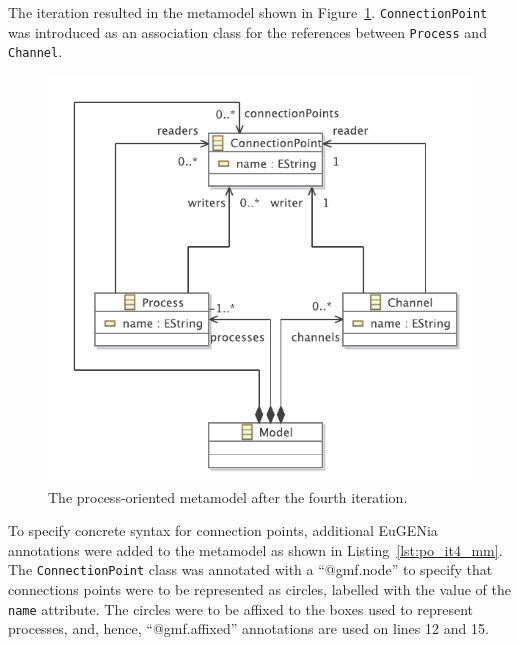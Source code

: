 The iteration resulted in the metamodel shown in Figure~\ref{fig:po_it4_mm}. \texttt{Co\-nn\-ec\-ti\-o\-nP\-oi\-nt} was introduced as an association class for the references between \texttt{Pr\-oc\-e\-ss} and \texttt{Cha\-nn\-el}.

\begin{figure}[htbp]
	\centering
		\includegraphics[scale=0.75]{A.2.ProcessOriented/images/4_mm.pdf}
	\caption{The process-oriented metamodel after the fourth iteration.}
	\label{fig:po_it4_mm}
\end{figure}

To specify concrete syntax for connection points, additional EuGENia annotations were added to the metamodel as shown in Listing~\ref{lst:po_it4_mm}. The \texttt{Co\-nn\-ec\-ti\-o\-nP\-oi\-nt} class was annotated with a ``@gmf.node'' to specify that connections points were to be represented as circles, labelled with the value of the \texttt{name} attribute. The circles were to be affixed to the boxes used to represent processes, and, hence, ``@gmf.affixed'' annotations are used on lines 12 and 15.

